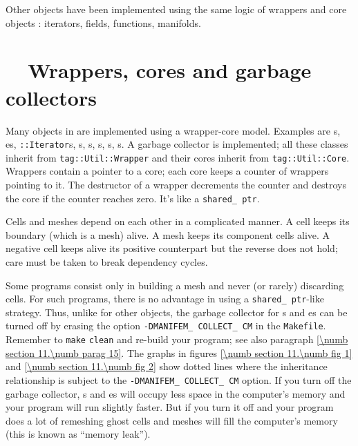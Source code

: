 Other objects have been implemented using the same logic of wrappers and core objects :
iterators, fields, functions, manifolds.


\section{~~Wrappers, cores and garbage collectors}\label{\numb section 11.\numb parag 5}

Many objects in {\maniFEM} are implemented using a wrapper-core model.
Examples are {\small\tt{}}s, {\small\tt{}}es,
{\small\tt{}::Iterator}s, {\small\tt{}}s,
{\small\tt{}}s, {\small\tt{}}s, {\small\tt{}}s,%
s.
A garbage collector is implemented; all these classes inherit from
{\small\tt \textcolor{tag}{tag}::Util::Wrapper} and
their cores inherit from {\small\tt \textcolor{tag}{tag}::Util::Core}.
Wrappers contain a pointer to a core; each core keeps a counter of wrappers pointing to it.
The destructor of a wrapper decrements the counter and destroys the core if the counter
reaches zero.
It's like a {\small\tt shared\_\,ptr}.

Cells and meshes depend on each other in a complicated manner.
A cell keeps its boundary (which is a mesh) alive.
A mesh keeps its component cells alive.
A negative cell keeps alive its positive counterpart but the reverse does not hold;
care must be taken to break dependency cycles.

Some programs consist only in building a mesh and never (or rarely) discarding cells.
For such programs, there is no advantage in using a {\small\tt shared\_\,ptr}-like strategy.
Thus, unlike for other {\maniFEM} objects, the garbage collector for {\small\tt{}}s and
{\small\tt{}}es can be turned off by erasing the option
{\small\tt -DMANIFEM\_\,COLLECT\_\,CM} in the {\small\tt Makefile}.
Remember to {\small\tt make} {\small\tt clean} and re-build your program;
see also paragraph \ref{\numb section 11.\numb parag 15}.
The graphs in figures \ref{\numb section 11.\numb fig 1} and \ref{\numb section 11.\numb fig 2}
show dotted lines where the inheritance relationship is subject to the
{\small\tt -DMANIFEM\_\,COLLECT\_\,CM} option.
If you turn off the garbage collector, {\small\tt{}}s and {\small\tt{}}es
will occupy less space in the computer's memory and your program will run slightly faster.
But if you turn it off and your program does a lot of remeshing
ghost cells and meshes will fill the computer's memory (this is known as ``memory leak'').

